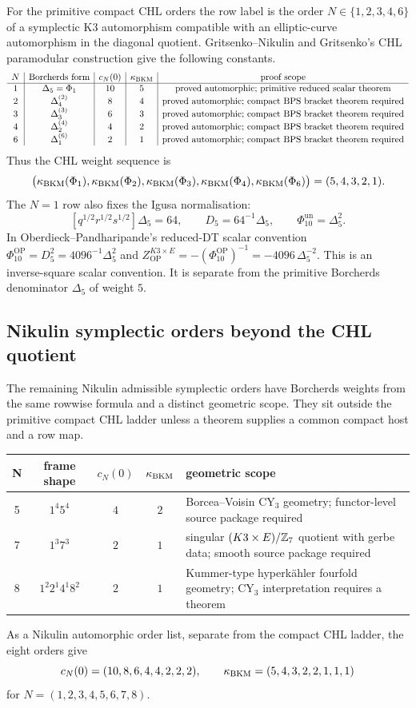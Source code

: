 For the primitive compact CHL orders the row label is the order
$N\in\{1,2,3,4,6\}$ of a symplectic K3 automorphism compatible with an
elliptic-curve automorphism in the diagonal quotient.  Gritsenko--Nikulin
and Gritsenko's CHL paramodular construction give the following constants.
\[
\begin{array}{c|c|c|c|c}
N & \text{Borcherds form} & c_N(0) & \kappa_{\mathrm{BKM}} & \text{proof scope}\\ \hline
1 & \Delta_5=\Phi_1 & 10 & 5 &
  \text{proved automorphic; primitive reduced scalar theorem}\\
2 & \Delta_{4}^{(2)} & 8 & 4 &
  \text{proved automorphic; compact BPS bracket theorem required}\\
3 & \Delta_{3}^{(3)} & 6 & 3 &
  \text{proved automorphic; compact BPS bracket theorem required}\\
4 & \Delta_{2}^{(4)} & 4 & 2 &
  \text{proved automorphic; compact BPS bracket theorem required}\\
6 & \Delta_{1}^{(6)} & 2 & 1 &
  \text{proved automorphic; compact BPS bracket theorem required}
\end{array}
\]
Thus the CHL weight sequence is
\[
  \bigl(\kappa_{\mathrm{BKM}}(\Phi_1),\kappa_{\mathrm{BKM}}(\Phi_2),\kappa_{\mathrm{BKM}}(\Phi_3),
  \kappa_{\mathrm{BKM}}(\Phi_4),\kappa_{\mathrm{BKM}}(\Phi_6)\bigr)=(5,4,3,2,1).
\]
The $N=1$ row also fixes the Igusa normalisation:
\[
  [q^{1/2}r^{1/2}s^{1/2}]\Delta_5=64,\qquad
  D_5=64^{-1}\Delta_5,\qquad
  \Phi_{10}^{\mathrm{un}}=\Delta_5^2.
\]
In Oberdieck--Pandharipande's reduced-DT scalar convention
$\Phi_{10}^{\mathrm{OP}}=D_5^2=4096^{-1}\Delta_5^2$ and
$Z_{\mathrm{OP}}^{K3\times E}=-(\Phi_{10}^{\mathrm{OP}})^{-1}
=-4096\,\Delta_5^{-2}$.  This is an inverse-square scalar convention.
It is separate from the primitive Borcherds denominator $\Delta_5$ of
weight $5$.

\subsection*{Nikulin symplectic orders beyond the CHL quotient}

The remaining Nikulin admissible symplectic orders have Borcherds weights
from the same rowwise formula and a distinct geometric scope.  They sit
outside the primitive compact CHL ladder unless a theorem supplies a
common compact host and a row map.
\begin{center}
\begin{tabular}{c|c|c|c|p{7.1cm}}
N & frame shape & $c_N(0)$ & $\kappa_{\mathrm{BKM}}$ & geometric scope\\ \hline
5 & $1^4 5^4$ & $4$ & $2$ &
  Borcea--Voisin CY$_3$ geometry; functor-level source package required\\
7 & $1^3 7^3$ & $2$ & $1$ &
  singular $(K3\times E)/\mathbb{Z}_7$ quotient with gerbe data; smooth source package required\\
8 & $1^2 2^1 4^1 8^2$ & $2$ & $1$ &
  Kummer-type hyperk\"ahler fourfold geometry; CY$_3$ interpretation requires a theorem
\end{tabular}
\end{center}
As a Nikulin automorphic order list, separate from the compact CHL ladder,
the eight orders give
\[
  c_N(0)=(10,8,6,4,4,2,2,2),\qquad
  \kappa_{\mathrm{BKM}}=(5,4,3,2,2,1,1,1)
\]
for $N=(1,2,3,4,5,6,7,8)$.

